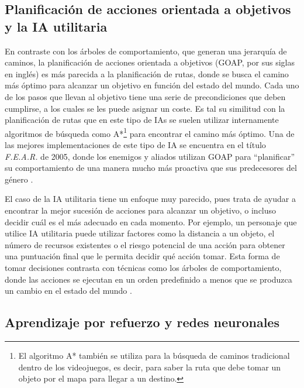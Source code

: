 \subsection{Planificación de acciones orientada a objetivos y la IA utilitaria}

En contraste con los árboles de comportamiento, que generan una jerarquía de caminos, la planificación de acciones orientada a objetivos (GOAP, por sus siglas en inglés) es más parecida a la planificación de rutas, donde se busca el camino más óptimo para alcanzar un objetivo en función del estado del mundo. Cada uno de los pasos que llevan al objetivo tiene una serie de precondiciones que deben cumplirse, a los cuales se les puede asignar un coste. Es tal su similitud con la planificación de rutas que en este tipo de IAs se suelen utilizar internamente algoritmos de búsqueda como A*\footnote{El algoritmo A* también se utiliza para la búsqueda de caminos tradicional dentro de los videojuegos, es decir, para saber la ruta que debe tomar un objeto por el mapa para llegar a un destino.} para encontrar el camino más óptimo. Una de las mejores implementaciones de este tipo de IA se encuentra en el título \textit{F.E.A.R.} de 2005, donde los enemigos y aliados utilizan GOAP para ``planificar'' su comportamiento de una manera mucho más proactiva que sus predecesores del género \cite{jeff_gdc_2006}.

El caso de la IA utilitaria tiene un enfoque muy parecido, pues trata de ayudar a encontrar la mejor sucesión de acciones para alcanzar un objetivo, o incluso decidir cuál es el más adecuado en cada momento. Por ejemplo, un personaje que utilice IA utilitaria puede utilizar factores como la distancia a un objeto, el número de recursos existentes o el riesgo potencial de una acción para obtener una puntuación final que le permita decidir qué acción tomar. Esta forma de tomar decisiones contrasta con técnicas como los árboles de comportamiento, donde las acciones se ejecutan en un orden predefinido a menos que se produzca un cambio en el estado del mundo \cite{thompson_ai_2024}.

\subsection{Aprendizaje por refuerzo y redes neuronales}

